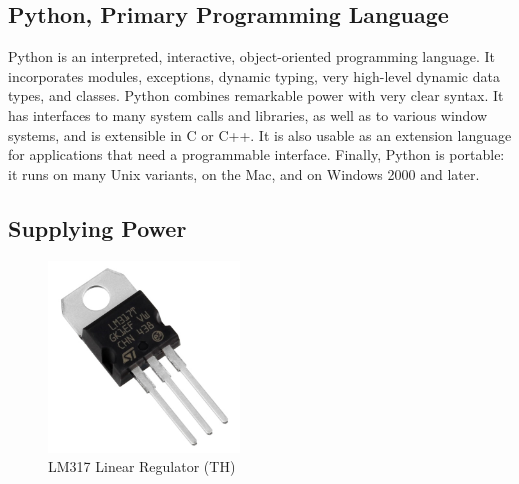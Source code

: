 \documentclass[a4paper,11pt]{report}
\begin{document}
	\subsection{Python, Primary Programming Language}
	Python is an interpreted, interactive, object-oriented programming language. It incorporates modules, exceptions, dynamic typing, very high-level dynamic data types, and classes. Python combines remarkable power with very clear syntax. It has interfaces to many system calls and libraries, as well as to various window systems, and is extensible in C or C++. It is also usable as an extension language for applications that need a programmable interface. Finally, Python is portable: it runs on many Unix variants, on the Mac, and on Windows 2000 and later.
	
	\subsection{Supplying Power}
	\begin{figure}
		\includegraphics[width=2in]{lm317.jpg}
		\caption{\small LM317 Linear Regulator (TH)}
	\end{figure}
\end{document}
